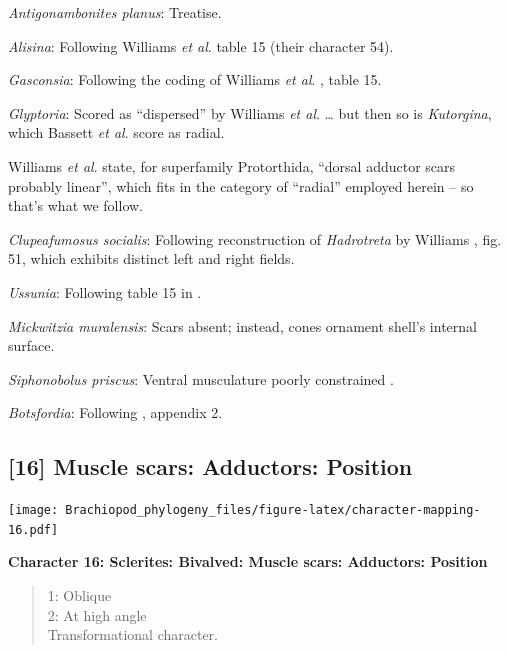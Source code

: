 \documentclass[openany]{book}
\theoremstyle{definition}
\theoremstyle{definition}
\theoremstyle{definition}
\theoremstyle{remark}
\begin{document}
\emph{Antigonambonites planus}: Treatise.

\emph{Alisina}: Following Williams \emph{et al}.
\citeyearpar{Williams2000BrachiopodaLinguliformea} table 15 (their
character 54).

\emph{Gasconsia}: Following the coding of Williams \emph{et al}.
\citeyearpar{Williams2000BrachiopodaLinguliformea}, table 15.

\emph{Glyptoria}: Scored as ``dispersed'' by Williams \emph{et al}.
\citeyearpar{Williams1998Thediversity} \ldots{} but then so is
\emph{Kutorgina}, which Bassett \emph{et al}.
\citeyearpar{Bassett2001Functionalmorphology} score as radial.

Williams \emph{et al}.
\citeyearpar{Williams2000BrachiopodaLinguliformea} state, for
superfamily Protorthida, ``dorsal adductor scars probably linear'',
which fits in the category of ``radial'' employed herein -- so that's
what we follow.

\emph{Clupeafumosus socialis}: Following reconstruction of
\emph{Hadrotreta} by Williams
\citeyearpar{Williams2000BrachiopodaLinguliformea}, fig. 51, which
exhibits distinct left and right fields.

\emph{Ussunia}: Following table 15 in
\citet{Williams2000BrachiopodaLinguliformea}.

\emph{Mickwitzia muralensis}: Scars absent; instead, cones ornament
shell's internal surface.

\emph{Siphonobolus priscus}: Ventral musculature poorly constrained
\citep{Williams2000BrachiopodaLinguliformea, Popov2009Earlyontogeny}.

\emph{Botsfordia}: Following \citet{Williams1998Thediversity}, appendix
2.

\hypertarget{muscle-scars-adductors-position}{%
\subsection*{{[}16{]} Muscle scars: Adductors:
Position}\label{muscle-scars-adductors-position}}

\texttt{[image: Brachiopod\_phylogeny\_files/figure-latex/character-mapping-16.pdf]}

\textbf{Character 16: Sclerites: Bivalved: Muscle scars: Adductors:
Position}

\begin{quote}
1: Oblique\\
2: At high angle\\
Transformational character.
\end{quote}
\end{document}
